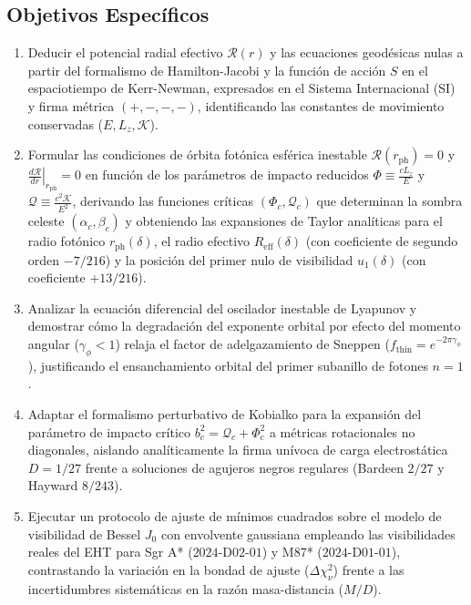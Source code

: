 \subsection{Objetivos Específicos}
\begin{enumerate}
    \item Deducir el potencial radial efectivo $\mathcal{R}(r)$ y las ecuaciones geodésicas nulas a partir del formalismo de Hamilton-Jacobi y la función de acción $S$ en el espaciotiempo de Kerr-Newman, expresados en el Sistema Internacional (SI) y firma métrica $(+,-,-,-)$, identificando las constantes de movimiento conservadas ($E, L_z, \mathcal{K}$).
    \item Formular las condiciones de órbita fotónica esférica inestable $\mathcal{R}(r_{\mathrm{ph}}) = 0$ y $\left.\frac{d\mathcal{R}}{dr}\right|_{r_{\mathrm{ph}}} = 0$ en función de los parámetros de impacto reducidos $\Phi \equiv \frac{c L_z}{E}$ y $\mathcal{Q} \equiv \frac{c^2 \mathcal{K}}{E^2}$, derivando las funciones críticas $(\Phi_c, \mathcal{Q}_c)$ que determinan la sombra celeste $(\alpha_c, \beta_c)$ y obteniendo las expansiones de Taylor analíticas para el radio fotónico $r_{\mathrm{ph}}(\delta)$, el radio efectivo $R_{\mathrm{eff}}(\delta)$ (con coeficiente de segundo orden $-7/216$) y la posición del primer nulo de visibilidad $u_1(\delta)$ (con coeficiente $+13/216$).
    \item Analizar la ecuación diferencial del oscilador inestable de Lyapunov y demostrar cómo la degradación del exponente orbital por efecto del momento angular ($\gamma_\phi < 1$) relaja el factor de adelgazamiento de Sneppen ($f_{\mathrm{thin}} = e^{-2\pi\gamma_\phi}$), justificando el ensanchamiento orbital del primer subanillo de fotones $n=1$.
    \item Adaptar el formalismo perturbativo de Kobialko para la expansión del parámetro de impacto crítico $b_c^2 = \mathcal{Q}_c + \Phi_c^2$ a métricas rotacionales no diagonales, aislando analíticamente la firma unívoca de carga electrostática $D = 1/27$ frente a soluciones de agujeros negros regulares (Bardeen $2/27$ y Hayward $8/243$).
    \item Ejecutar un protocolo de ajuste de mínimos cuadrados sobre el modelo de visibilidad de Bessel $J_0$ con envolvente gaussiana empleando las visibilidades reales del EHT para Sgr A* ($2024\text{-D02-01}$) y M87* ($2024\text{-D01-01}$), contrastando la variación en la bondad de ajuste ($\Delta\chi^2_\nu$) frente a las incertidumbres sistemáticas en la razón masa-distancia ($M/D$).
\end{enumerate}